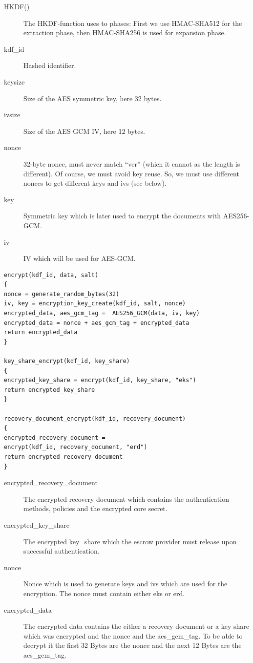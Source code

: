 \begin{description}
	\item[HKDF()] {The HKDF-function uses to phases: First we use HMAC-SHA512 for the extraction phase, then HMAC-SHA256 is used for expansion phase.}
	\item[kdf\_id] {Hashed identifier.}
	\item[keysize] {Size of the AES symmetric key, here 32 bytes.}
	\item[ivsize] {Size of the AES GCM IV, here 12 bytes.}
	\item[nonce] {32-byte nonce, must never match “ver” (which it cannot as the length is different). Of course, we must avoid key reuse. So, we must use different nonces to get different keys and ivs (see below).}
	\item[key] {Symmetric key which is later used to encrypt the documents with AES256-GCM.}
	\item[iv] {IV which will be used for AES-GCM.}
\end{description}


\begin{lstlisting}
encrypt(kdf_id, data, salt)
{
nonce = generate_random_bytes(32)
iv, key = encryption_key_create(kdf_id, salt, nonce)
encrypted_data, aes_gcm_tag =  AES256_GCM(data, iv, key)
encrypted_data = nonce + aes_gcm_tag + encrypted_data
return encrypted_data
}

key_share_encrypt(kdf_id, key_share)
{
encrypted_key_share = encrypt(kdf_id, key_share, "eks")
return encrypted_key_share
}

recovery_document_encrypt(kdf_id, recovery_document)
{
encrypted_recovery_document =
encrypt(kdf_id, recovery_document, "erd")
return encrypted_recovery_document
}

\end{lstlisting}

\begin{description}
	\item[encrypted\_recovery\_document] {The encrypted recovery document which contains the authentication methods, policies and the encrypted core secret.}
	\item[encrypted\_key\_share] {The encrypted key\_share which the escrow provider must release upon successful authentication.}
	\item[nonce] {Nonce which is used to generate keys and ivs which are used for the encryption. The nonce must contain either eks or erd.}
	\item[encrypted\_data] {The encrypted data contains the either a recovery document or a key share which was encrypted and the nonce and the aes\_gcm\_tag. To be able to decrypt it the first 32 Bytes are the nonce and the next 12 Bytes are the aes\_gcm\_tag.}
\end{description}


